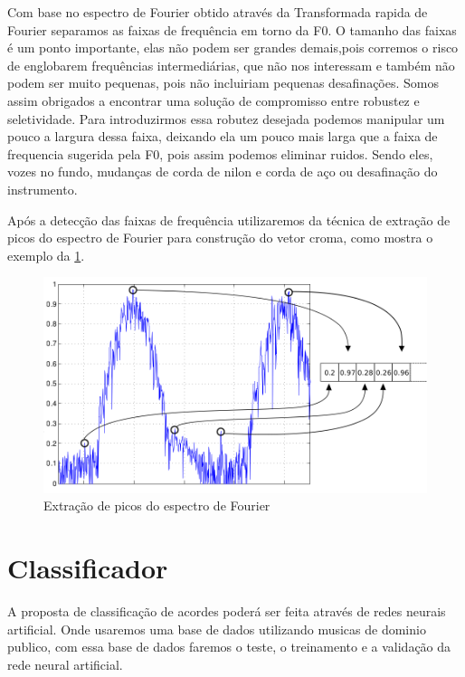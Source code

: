 Com base no espectro de Fourier obtido através da Transformada rapida de Fourier separamos as faixas de frequência em torno da F0. 
O tamanho das faixas é um ponto importante, elas não podem ser grandes demais,pois corremos o risco de englobarem frequências intermediárias, que não nos interessam e também não podem ser muito pequenas, pois não incluiriam pequenas desafinações. Somos assim obrigados a encontrar uma solução de compromisso entre robustez e seletividade.
Para introduzirmos essa robutez desejada podemos manipular um pouco a largura dessa faixa, deixando ela um pouco mais larga que a faixa de frequencia sugerida pela F0, pois assim podemos eliminar ruidos. Sendo eles, vozes no fundo, mudanças de corda de nilon e corda de aço ou desafinação do instrumento.

Após a detecção das faixas de frequência utilizaremos da técnica de extração de picos do espectro de Fourier para construção do vetor croma, como mostra o exemplo da  \cref{extracaoPicos}.

\begin{figure}[!htb]
     \centering
     \includegraphics[scale=0.5]{figuras/picos2.png}
     \caption{Extração de picos do espectro de Fourier}
     \label{extracaoPicos}
\end{figure} 


\section{Classificador}
\label{cap:classificador}

A proposta de classificação de acordes poderá ser feita através de redes neurais artificial.
Onde usaremos uma base de dados utilizando musicas de dominio publico, com essa base de dados faremos o teste, o treinamento e a validação da rede neural artificial.

